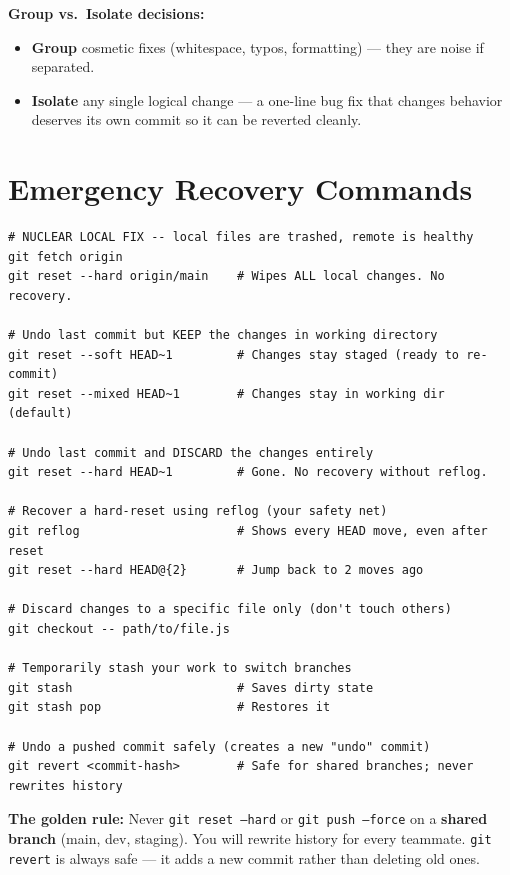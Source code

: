 \documentclass[11pt, letterpaper]{article}
\begin{document}
\textbf{Group vs.\ Isolate decisions:}
\begin{itemize}[noitemsep]
  \item \textbf{Group} cosmetic fixes (whitespace, typos, formatting) --- they are noise if separated.
  \item \textbf{Isolate} any single logical change --- a one-line bug fix that changes behavior deserves its own commit so it can be reverted cleanly.
\end{itemize}

\section*{Emergency Recovery Commands}

\begin{lstlisting}[style=shell, caption={Emergency recovery: when things go wrong}]
# NUCLEAR LOCAL FIX -- local files are trashed, remote is healthy
git fetch origin
git reset --hard origin/main    # Wipes ALL local changes. No recovery.

# Undo last commit but KEEP the changes in working directory
git reset --soft HEAD~1         # Changes stay staged (ready to re-commit)
git reset --mixed HEAD~1        # Changes stay in working dir (default)

# Undo last commit and DISCARD the changes entirely
git reset --hard HEAD~1         # Gone. No recovery without reflog.

# Recover a hard-reset using reflog (your safety net)
git reflog                      # Shows every HEAD move, even after reset
git reset --hard HEAD@{2}       # Jump back to 2 moves ago

# Discard changes to a specific file only (don't touch others)
git checkout -- path/to/file.js

# Temporarily stash your work to switch branches
git stash                       # Saves dirty state
git stash pop                   # Restores it

# Undo a pushed commit safely (creates a new "undo" commit)
git revert <commit-hash>        # Safe for shared branches; never rewrites history
\end{lstlisting}

\begin{tcolorbox}[colback=part6bg, colframe=sectionred, arc=3pt, boxrule=1pt]
\textbf{The golden rule:} Never \texttt{git reset --hard} or \texttt{git push --force} on a \textbf{shared branch} (main, dev, staging). You will rewrite history for every teammate. \texttt{git revert} is always safe --- it adds a new commit rather than deleting old ones.
\end{tcolorbox}
\end{document}
